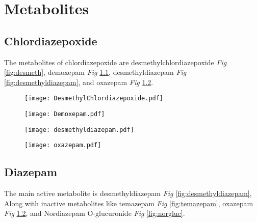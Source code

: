 \chapter{Metabolites}

\section{Chlordiazepoxide}
\label{sec:met:chlor}
The metabolites of chlordiazepoxide are desmethylchlordiazepoxide \emph{Fig} \ref{fig:desmeth}, demoxepam \emph{Fig} \ref{fig:demoxepam}, desmethyldiazepam \emph{Fig} \ref{fig:desmethyldiazepam}, and oxazepam \emph{Fig} \ref{fig:oxazepam}.\cite{schwartz1971biological}

\begin{figure}[h]
	\centering
	\begin{minipage}{0.5\linewidth}
		\centering
		\texttt{[image: DesmethylChlordiazepoxide.pdf]}
		\label{fig:desmeth}
	\end{minipage}%
	\begin{minipage}{0.5\textwidth}
		\centering
		\texttt{[image: Demoxepam.pdf]}
		\label{fig:demoxepam}
	\end{minipage}
\end{figure}

\begin{figure}[h]
	\centering
	\begin{minipage}{0.5\linewidth}
		\centering
		\texttt{[image: desmethyldiazepam.pdf]}
		\label{fig:desmethyldiazepam}
	\end{minipage}%
	\begin{minipage}{0.5\textwidth}
		\centering
		\texttt{[image: oxazepam.pdf]}
		\label{fig:oxazepam}
	\end{minipage}
\end{figure}


\section{Diazepam}
 	The main active metabolite is desmethyldiazepam \emph{Fig} \ref{fig:desmethyldiazepam}, Along with inactive metabolites like temazepam \emph{Fig} \ref{fig:temazepam}, oxazepam \emph{Fig} \ref{fig:oxazepam}, and Nordiazepam O-glucuronide \emph{Fig} \ref{fig:norgluc}.\cite{RCM:RCM3613}

